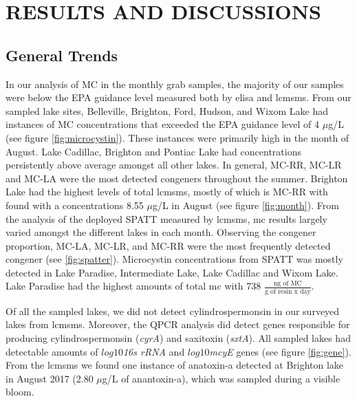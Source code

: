 \chapter{RESULTS AND DISCUSSIONS}
\section{General Trends}


In our analysis of MC in the monthly grab samples, the majority of our samples were below the EPA guidance level measured both by \gls{elisa} and \gls{lcmsms}. From our sampled lake sites, Belleville, Brighton, Ford, Hudson, and Wixom Lake had instances of MC concentrations that exceeded the EPA guidance level of 4 $\mu$g/L  (see figure \ref{fig:microcystin}). These instances were primarily high in the month of August. Lake Cadillac, Brighton and Pontiac Lake had concentrations persistently above average amongst all other lakes. In general, MC-RR, MC-LR and MC-LA were the most detected congeners throughout the summer. Brighton Lake had the highest levels of total \gls{lcmsms}, mostly of which is MC-RR with found with a concentrations 8.55 $\mu$g/L in August (see figure \ref{fig:month}). From the analysis of the deployed SPATT measured by \gls{lcmsms}, \gls{mc} results largely varied amongst the different lakes in each month. Observing the congener proportion, MC-LA, MC-LR, and MC-RR were the most frequently detected congener (see \ref{fig:spatter}). Microcystin concentrations from SPATT was mostly detected in Lake Paradise, Intermediate Lake, Lake Cadillac and Wixom Lake. Lake Paradise had the highest amounts of total \gls{mc} with 738 $\frac{\text{ng of MC}}{\text{g of resin x day}}$.  

Of all the sampled lakes, we did not detect cylindrospermonsin in our surveyed lakes from \gls{lcmsms}. Moreover, the QPCR analysis did detect genes responsible for producing cylindrospermonsin (\emph{cyrA}) and saxitoxin (\emph{sxtA}). All sampled lakes had detectable amounts of $log10$\emph{16s rRNA} and $log10$\emph{mcyE} genes (see figure \ref{fig:gene}).  From the \gls{lcmsms} we found one instance of anatoxin-a detected at Brighton lake in August 2017 (2.80 $\mu$g/L of anantoxin-a), which was sampled during a visible bloom. %


